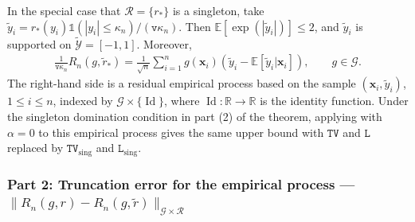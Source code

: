 \documentclass[10pt]{article}
\newcommand{\E}{\mathbb{E}}
\newcommand{\Indicator}{\mathds{1}}
\newcommand{\reals}{\mathbb{R}}
\newcommand{\bx}{\mathbf{x}}
\newcommand{\G}{\mathcal{G}}
\newcommand{\R}{\mathcal{R}}
\newcommand{\Y}{\mathcal{Y}}
\newcommand{\ttL}{\mathtt{L}}
\newcommand{\ttv}{\mathtt{v}}
\newcommand{\ttTV}{\mathtt{TV}}
\begin{document}
In the special case that $\R = \{r_{\ast}\}$ is a singleton, take $\tilde{y}_i = r_{\ast}(y_i) \Indicator(|y_i| \leq \kappa_n)/(\ttv \kappa_n)$. Then $\E[\exp(|\tilde{y}_i|)] \leq 2$, and $\tilde{y}_i$ is supported on $\tilde{\Y} = [-1,1]$. Moreover,
\begin{align*}
    \frac{1}{\ttv \kappa_n}R_n(g, \tilde{r}_{\ast}) = \frac{1}{\sqrt{n}} \sum_{i = 1}^n g(\bx_i) (\tilde{y}_i - \E[\tilde{y}_i|\bx_i]), \qquad g \in \G.
\end{align*}
The right-hand side is a residual empirical process based on the sample $(\bx_i, \tilde{y}_i)$, $1 \leq i \leq n$, indexed by $\G \times \{\operatorname{Id}\}$, where $\operatorname{Id}: \reals \to \reals$ is the identity function. Under the singleton domination condition in part (2) of the theorem, applying \citet[Theorem 2]{Cattaneo-Yu_2025_AOS} with $\alpha = 0$ to this empirical process gives the same upper bound with $\ttTV$ and $\ttL$ replaced by $\ttTV_{\text{sing}}$ and $\ttL_{\text{sing}}$.

\subsubsection*{Part 2: Truncation error for the empirical process --- $\lVert R_n(g,r) - R_n(g, \widetilde{r})\rVert_{\G \times \R}$}
\end{document}
